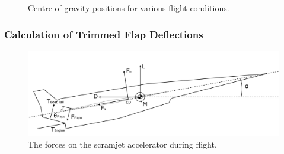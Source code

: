 \begin{figure}
\begin{subfigure}{.5\textwidth}
			\end{subfigure}
			\caption{Centre of gravity positions for various flight conditions.}
			\label{fig:CentreOfGravity}
		\end{figure}
		
		
		\subsubsection{Calculation of Trimmed Flap Deflections}\label{sec:trim}
		
		
		\begin{figure}[ht]
			\centering
			\includegraphics[width=0.7\linewidth]{figures/3_vehicle_design/SPARTANForces}
			\caption{The forces on the scramjet accelerator during flight.}
			\label{fig:SPARTANForces}
		\end{figure}
		
